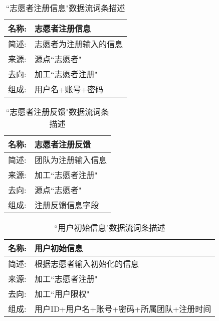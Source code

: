 \begin{table}[H]  
\caption{``志愿者注册信息"数据流词条描述}  
\begin{center}  
    \begin{tabular}{l p{11cm}} 
        \hline
        \quad 名称:  &   志愿者注册信息 \\
        \hline
        \quad 简述:  & 志愿者为注册输入的信息 \\
        \hline
        \quad 来源:  & 源点``志愿者"\\
        \hline
        \quad 去向:  & 加工``志愿者注册" \\
        \hline
        \quad 组成:  & 用户名+账号+密码 \\
        \hline
    \end{tabular}
    \label{tab1}
\end{center}
\end{table}

\begin{table}[H]  
\caption{``志愿者注册反馈"数据流词条描述}  
\begin{center}  
    \begin{tabular}{l p{11cm}} 
        \hline
        \quad 名称:  &   志愿者注册反馈 \\
        \hline
        \quad 简述:  & 团队为注册输入信息 \\
        \hline
        \quad 来源:  & 加工``志愿者注册"\\
        \hline
        \quad 去向:  & 源点``志愿者" \\
        \hline
        \quad 组成:  & 注册反馈信息字段 \\
        \hline
    \end{tabular}
    \label{tab1}
\end{center}
\end{table}

\begin{table}[H]  
\caption{``用户初始信息"数据流词条描述}  
\begin{center}  
    \begin{tabular}{l p{11cm}} 
        \hline
        \quad 名称:  &   用户初始信息 \\
        \hline
        \quad 简述:  & 根据志愿者输入初始化的信息 \\
        \hline
        \quad 来源:  & 加工``志愿者注册"\\
        \hline
        \quad 去向:  & 加工``用户限权" \\
        \hline
        \quad 组成:  & 用户ID+用户名+账号+密码+所属团队+注册时间 \\
        \hline
    \end{tabular}
    \label{tab1}
\end{center}
\end{table}

